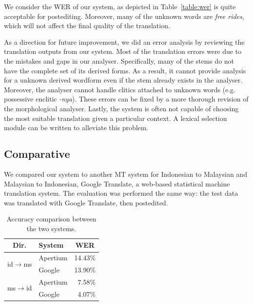 \documentclass[10pt,a5paper,twoside]{article}
\begin{document}
We consider the WER of our system, as depicted in Table~\ref{table:wer} is quite acceptable for postediting. Moreover, many of the unknown words are \emph{free rides}, which will not affect the final quality of the translation.

As a direction for future improvement, we did an error analysis by reviewing the translation outputs from our system. Most of the translation errors were due to the mistakes and gaps in our analyser. Specifically, many of the stems do not have the complete set of its derived forms. As a result, it cannot provide analysis for a unknown derived wordform even if the stem already exists in the analyser. Moreover, the analyser cannot handle clitics attached to unknown words (e.g. possessive enclitic \emph{-nya}). These errors can be fixed by a more thorough revision of the morphological analyser. Lastly, the system is often not capable of choosing the most suitable translation given a particular context. A lexical selection module can be written to alleviate this problem.

\subsection{Comparative}
We compared our system to another MT system for Indonesian to Malaysian and Malaysian to Indonesian, Google Translate, a web-based statistical machine translation system. The evaluation was performed the same way: the test data was translated with Google Translate, then postedited.

\begin{table}[htbp]
  \begin{center}
  \begin{tabular}{clr}
  \toprule
  \bf{Dir.}                 & \bf{System}         & \multicolumn{1}{c}{\bf{WER}}  \\
  \midrule
  \multirow{2}{*}{id$\rightarrow$ms} & Apertium & 14.43\% \\
                                     & Google & 13.90\% \\
  \midrule
  \multirow{2}{*}{ms$\rightarrow$id} & Apertium & 7.58\% \\
                                     & Google & 4.07\% \\
  \bottomrule
  \end{tabular}
    \caption{Accuracy comparison between the two systems.}
    \label{table:comp}
  \end{center}
\end{table}
\end{document}

